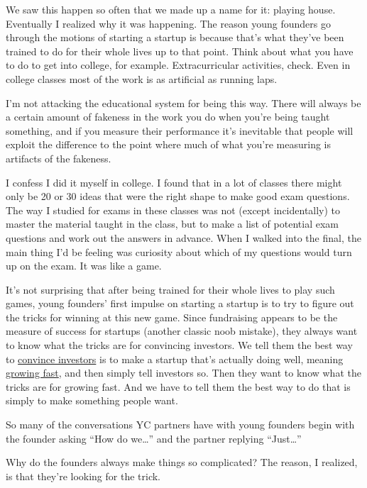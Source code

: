 \documentclass[12pt]{book}
\begin{document}
We saw this happen so often that we made up a name for it: playing
house. Eventually I realized why it was happening. The reason young
founders go through the motions of starting a startup is because that's
what they've been trained to do for their whole lives up to that point.
Think about what you have to do to get into college, for example.
Extracurricular activities, check. Even in college classes most of the
work is as artificial as running laps.

I'm not attacking the educational system for being this way. There will
always be a certain amount of fakeness in the work you do when you're
being taught something, and if you measure their performance it's
inevitable that people will exploit the difference to the point where
much of what you're measuring is artifacts of the fakeness.

I confess I did it myself in college. I found that in a lot of classes
there might only be 20 or 30 ideas that were the right shape to make
good exam questions. The way I studied for exams in these classes was
not (except incidentally) to master the material taught in the class,
but to make a list of potential exam questions and work out the answers
in advance. When I walked into the final, the main thing I'd be feeling
was curiosity about which of my questions would turn up on the exam. It
was like a game.

It's not surprising that after being trained for their whole lives to
play such games, young founders' first impulse on starting a startup is
to try to figure out the tricks for winning at this new game. Since
fundraising appears to be the measure of success for startups (another
classic noob mistake), they always want to know what the tricks are for
convincing investors. We tell them the best way to
\href{convince.html}{convince investors} is to make a startup that's
actually doing well, meaning \href{growth.html}{growing fast}, and then
simply tell investors so. Then they want to know what the tricks are for
growing fast. And we have to tell them the best way to do that is simply
to make something people want.

So many of the conversations YC partners have with young founders begin
with the founder asking ``How do we\ldots{}'' and the partner replying
``Just\ldots{}''

Why do the founders always make things so complicated? The reason, I
realized, is that they're looking for the trick.
\end{document}
